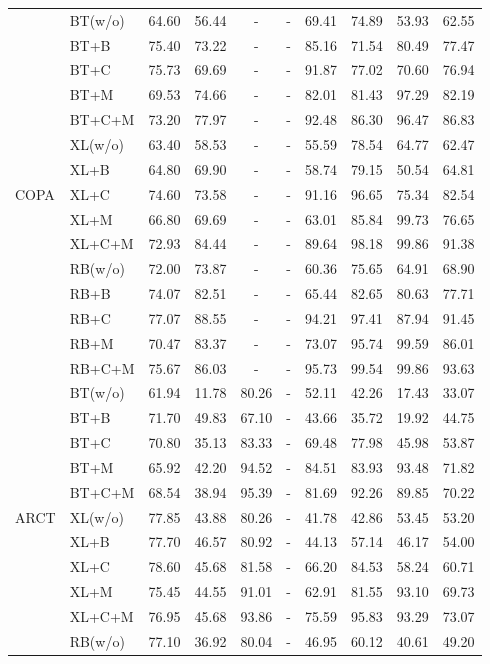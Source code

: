 \documentclass[runningheads]{llncs}
\begin{document}
\begin{table}[th]
\begin{tabular}{ll|c|ccccccc}
\multirow{15}{*}{COPA} 
&BT(w/o)&64.60 &56.44 &-&-&69.41 &74.89 &53.93 &62.55 \\ 
&BT+B&75.40 &73.22 &-&-&85.16 &71.54 &80.49 &77.47 \\ 
&BT+C&75.73 &69.69 &-&-&91.87 &77.02 &70.60 &76.94 \\ 
&BT+M&69.53 &74.66 &-&-&82.01 &81.43 &97.29 &82.19 \\ 
&BT+C+M&73.20 &77.97 &-&-&92.48 &86.30 &96.47 &86.83 \\ 
\cline{2-10}
&XL(w/o)&63.40 &58.53 &-&-&55.59 &78.54 &64.77 &62.47 \\ 
&XL+B&64.80 &69.90 &-&-&58.74 &79.15 &50.54 &64.81 \\ 
&XL+C&74.60 &73.58 &-&-&91.16 &96.65 &75.34 &82.54 \\ 
&XL+M&66.80 &69.69 &-&-&63.01 &85.84 &99.73 &76.65 \\ 
&XL+C+M&72.93 &84.44 &-&-&89.64 &98.18 &99.86 &91.38 \\ 
\cline{2-10}
&RB(w/o)&72.00 &73.87 &-&-&60.36 &75.65 &64.91 &68.90 \\ 
&RB+B&74.07 &82.51 &-&-&65.44 &82.65 &80.63 &77.71 \\ 
&RB+C&77.07 &88.55 &-&-&94.21 &97.41 &87.94 &91.45 \\ 
&RB+M&70.47 &83.37 &-&-&73.07 &95.74 &99.59 &86.01 \\ 
&RB+C+M&75.67 &86.03 &-&-&95.73 &99.54 &99.86 &93.63 \\ 
\hline
\multirow{15}{*}{ARCT} 
&BT(w/o)&61.94 &11.78 &80.26 &-&52.11 &42.26 &17.43 &33.07 \\ 
&BT+B&71.70 &49.83 &67.10 &-&43.66 &35.72 &19.92 &44.75 \\ 
&BT+C&70.80 &35.13 &83.33 &-&69.48 &77.98 &45.98 &53.87 \\ 
&BT+M&65.92 &42.20 &94.52 &-&84.51 &83.93 &93.48 &71.82 \\ 
&BT+C+M&68.54 &38.94 &95.39 &-&81.69 &92.26 &89.85 &70.22 \\ 
\cline{2-10}
&XL(w/o)&77.85 &43.88 &80.26 &-&41.78 &42.86 &53.45 &53.20 \\ 
&XL+B&77.70 &46.57 &80.92 &-&44.13 &57.14 &46.17 &54.00 \\ 
&XL+C&78.60 &45.68 &81.58 &-&66.20 &84.53 &58.24 &60.71 \\ 
&XL+M&75.45 &44.55 &91.01 &-&62.91 &81.55 &93.10 &69.73 \\ 
&XL+C+M&76.95 &45.68 &93.86 &-&75.59 &95.83 &93.29 &73.07 \\ 
\cline{2-10}
&RB(w/o)&77.10 &36.92 &80.04 &-&46.95 &60.12 &40.61 &49.20 \\ 

\end{tabular}
\end{table}
\end{document}
